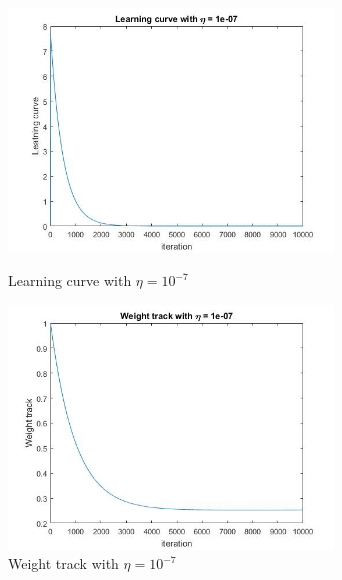 \documentclass[a4paper]{article}
\begin{document}
\begin{spacing}{2.0}
	\begin{figure}[H]
	    \begin{minipage}[t]{0.5\textwidth}
	        \centering
	        \includegraphics[width=3.4in]{LC_7.jpg}
	        \caption{Learning curve with $\eta = 10^{-7}$}
	        \label{fig:side:a}
	    \end{minipage}%
	  \begin{minipage}[t]{0.5\textwidth}
	      \centering
	      \includegraphics[width=3.4in]{WT_7.jpg}
	      \caption{Weight track with $\eta = 10^{-7}$}
	      \label{fig:side:b}
	    \end{minipage}
	\end{figure}
	

\end{spacing}
\end{document}
